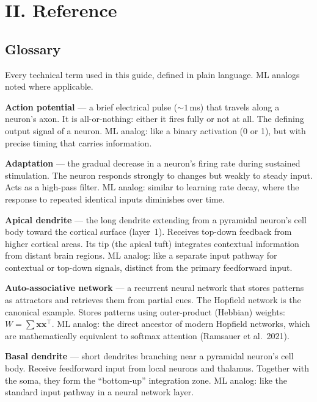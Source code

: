 \documentclass[11pt,a4paper]{article}
\begin{document}
\newpage


\section{II. Reference}

\subsection{Glossary}

Every technical term used in this guide, defined in plain language. ML analogs noted where applicable.

\bigskip

\textbf{Action potential} --- a brief electrical pulse (${\sim}1$\,ms) that travels along a neuron's axon. It is all-or-nothing: either it fires fully or not at all. The defining output signal of a neuron. ML analog: like a binary activation (0 or 1), but with precise timing that carries information.

\textbf{Adaptation} --- the gradual decrease in a neuron's firing rate during sustained stimulation. The neuron responds strongly to changes but weakly to steady input. Acts as a high-pass filter. ML analog: similar to learning rate decay, where the response to repeated identical inputs diminishes over time.

\textbf{Apical dendrite} --- the long dendrite extending from a pyramidal neuron's cell body toward the cortical surface (layer~1). Receives top-down feedback from higher cortical areas. Its tip (the apical tuft) integrates contextual information from distant brain regions. ML analog: like a separate input pathway for contextual or top-down signals, distinct from the primary feedforward input.

\textbf{Auto-associative network} --- a recurrent neural network that stores patterns as attractors and retrieves them from partial cues. The Hopfield network is the canonical example. Stores patterns using outer-product (Hebbian) weights: $W = \sum \mathbf{x}\mathbf{x}^\top$. ML analog: the direct ancestor of modern Hopfield networks, which are mathematically equivalent to softmax attention (Ramsauer et al.\ 2021).

\textbf{Basal dendrite} --- short dendrites branching near a pyramidal neuron's cell body. Receive feedforward input from local neurons and thalamus. Together with the soma, they form the ``bottom-up'' integration zone. ML analog: like the standard input pathway in a neural network layer.
\end{document}
